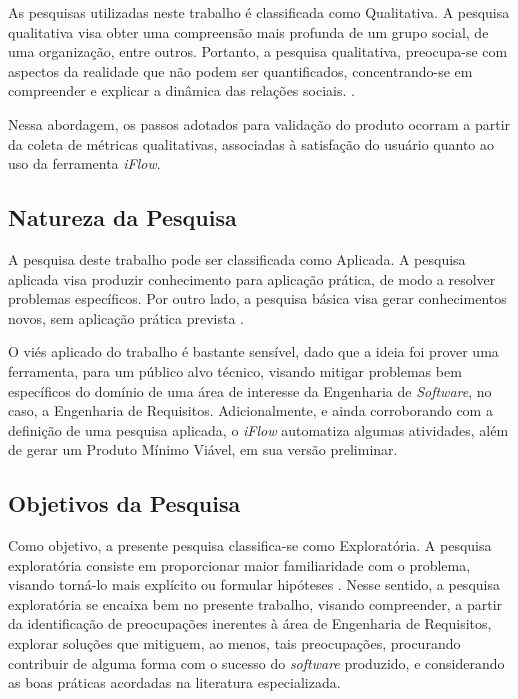 As pesquisas utilizadas neste trabalho é classificada como Qualitativa. A pesquisa qualitativa visa obter uma compreensão mais profunda de um grupo social, de uma organização, entre outros. Portanto, a pesquisa qualitativa, preocupa-se com aspectos da realidade que não podem ser quantificados, concentrando-se em compreender e explicar a dinâmica das relações sociais. \cite{gerhardt2009metodos}.

Nessa abordagem, os passos adotados para validação do produto ocorram a partir da coleta de métricas qualitativas, associadas à satisfação do usuário quanto ao uso da ferramenta \textit{iFlow}.

\subsection{Natureza da Pesquisa}

A pesquisa deste trabalho pode ser classificada como Aplicada. A pesquisa aplicada visa produzir conhecimento para aplicação prática, de modo a resolver problemas específicos. Por outro lado, a pesquisa básica visa gerar conhecimentos novos, sem aplicação prática prevista \cite{gerhardt2009metodos}.

O viés aplicado do trabalho é bastante sensível, dado que a ideia foi prover uma ferramenta, para um público alvo técnico, visando mitigar problemas bem específicos do domínio de uma área de interesse da Engenharia de \textit{Software}, no caso, a Engenharia de Requisitos. Adicionalmente, e ainda corroborando com a definição de uma pesquisa aplicada, o \textit{iFlow} automatiza algumas atividades, além de gerar um Produto Mínimo Viável, em sua versão preliminar.

\subsection{Objetivos da Pesquisa}
Como objetivo, a presente pesquisa classifica-se como Exploratória. A pesquisa exploratória consiste em proporcionar maior familiaridade com o problema, visando torná-lo mais explícito ou formular hipóteses \cite{gil2002elaborar}. Nesse sentido, a pesquisa exploratória se encaixa bem no presente trabalho, visando compreender, a partir da identificação de preocupações inerentes à área de Engenharia de Requisitos, explorar soluções que mitiguem, ao menos, tais preocupações, procurando contribuir de alguma forma com o sucesso do \textit{software} produzido, e considerando as boas práticas acordadas na literatura especializada.

